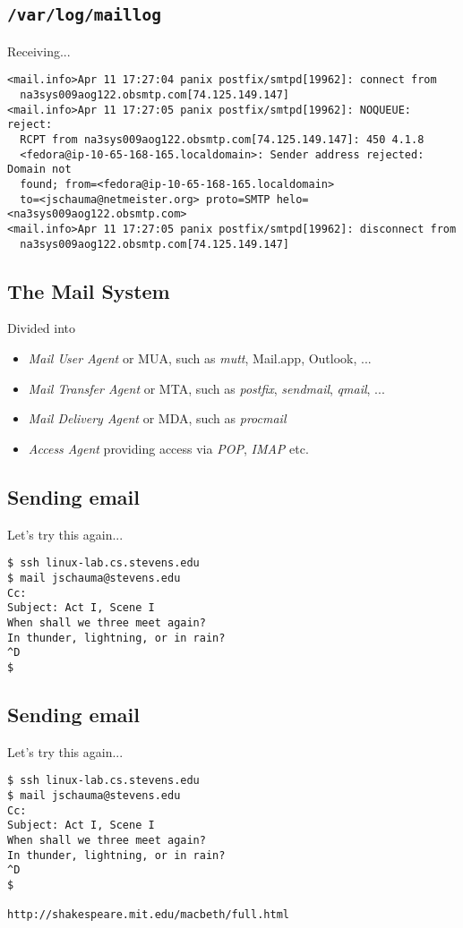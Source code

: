 \documentclass[xga]{xdvislides}
\begin{document}
\subsection{{\tt /var/log/maillog}}
Receiving...
\begin{verbatim}
<mail.info>Apr 11 17:27:04 panix postfix/smtpd[19962]: connect from
  na3sys009aog122.obsmtp.com[74.125.149.147]
<mail.info>Apr 11 17:27:05 panix postfix/smtpd[19962]: NOQUEUE: reject:
  RCPT from na3sys009aog122.obsmtp.com[74.125.149.147]: 450 4.1.8
  <fedora@ip-10-65-168-165.localdomain>: Sender address rejected: Domain not
  found; from=<fedora@ip-10-65-168-165.localdomain>
  to=<jschauma@netmeister.org> proto=SMTP helo=<na3sys009aog122.obsmtp.com>
<mail.info>Apr 11 17:27:05 panix postfix/smtpd[19962]: disconnect from
  na3sys009aog122.obsmtp.com[74.125.149.147]
\end{verbatim}

\subsection{The Mail System}
Divided into
\begin{itemize}
	\item {\em Mail User Agent} or MUA, such as {\em mutt}, Mail.app, Outlook, ...
	\item {\em Mail Transfer Agent} or MTA, such as {\em postfix},
{\em sendmail}, {\em qmail}, ...
	\item {\em Mail Delivery Agent} or MDA, such as {\em procmail}
	\item {\em Access Agent} providing access via {\em POP}, {\em IMAP} etc.
\end{itemize}


\subsection{Sending email}
Let's try this again...
\begin{verbatim}
$ ssh linux-lab.cs.stevens.edu
$ mail jschauma@stevens.edu
Cc:  
Subject: Act I, Scene I
When shall we three meet again?
In thunder, lightning, or in rain?
^D
$
\end{verbatim}

\subsection{Sending email}
Let's try this again...
\begin{verbatim}
$ ssh linux-lab.cs.stevens.edu
$ mail jschauma@stevens.edu
Cc:  
Subject: Act I, Scene I
When shall we three meet again?
In thunder, lightning, or in rain?
^D
$

http://shakespeare.mit.edu/macbeth/full.html
\end{verbatim}
\end{document}
